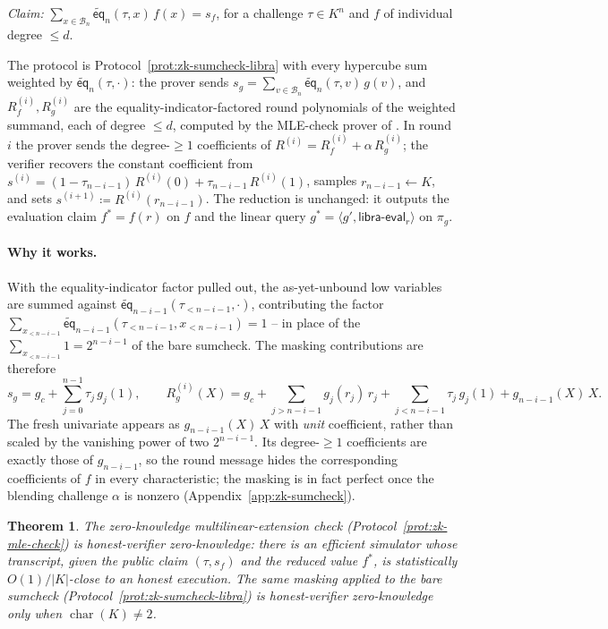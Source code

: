 \documentclass{article}
\newtheorem{theorem}{Theorem}[section]
\theoremstyle{definition}
\newcommand*{\mle}{\widetilde}
\newcommand{\eq}{\mathsf{eq}}
\newcommand{\BB}{\mathcal{B}}
\begin{document}
\begin{protocol}
\label{prot:zk-mle-check}
\emph{Claim:} $\sum_{x \in \BB_n} \mle{\eq}_n(\tau, x)\, f(x) = s_f$, for a challenge $\tau \in K^n$ and $f$ of individual degree $\le d$.

The protocol is Protocol~\ref{prot:zk-sumcheck-libra} with every hypercube sum weighted by $\mle{\eq}_n(\tau, \cdot)$: the prover sends $s_g = \sum_{v \in \BB_n} \mle{\eq}_n(\tau, v)\, g(v)$, and $R_f^{(i)}, R_g^{(i)}$ are the equality-indicator-factored round polynomials of the weighted summand, each of degree $\le d$, computed by the MLE-check prover of \cite{Gruen:2024aa}. In round $i$ the prover sends the degree-$\ge 1$ coefficients of $R^{(i)} = R_f^{(i)} + \alpha\, R_g^{(i)}$; the verifier recovers the constant coefficient from $s^{(i)} = (1 - \tau_{n - i - 1})\, R^{(i)}(0) + \tau_{n - i - 1}\, R^{(i)}(1)$, samples $r_{n - i - 1} \gets K$, and sets $s^{(i + 1)} \coloneqq R^{(i)}(r_{n - i - 1})$. The reduction is unchanged: it outputs the evaluation claim $f^* = f(r)$ on $f$ and the linear query $g^* = \langle g', \textsf{libra-eval}_r \rangle$ on $\pi_g$.
\end{protocol}

\paragraph{Why it works.}
With the equality-indicator factor pulled out, the as-yet-unbound low variables are summed against $\mle{\eq}_{n - i - 1}(\tau_{< n - i - 1}, \cdot)$, contributing the factor $\sum_{x_{< n - i - 1}} \mle{\eq}_{n - i - 1}(\tau_{< n - i - 1}, x_{< n - i - 1}) = 1$ -- in place of the $\sum_{x_{< n - i - 1}} 1 = 2^{n - i - 1}$ of the bare sumcheck. The masking contributions are therefore
\[
  s_g = g_c + \sum_{j = 0}^{n - 1} \tau_j\, g_j(1), \qquad R_g^{(i)}(X) = g_c + \sum_{j > n - i - 1} g_j(r_j)\, r_j + \sum_{j < n - i - 1} \tau_j\, g_j(1) + g_{n - i - 1}(X)\, X.
\]
The fresh univariate appears as $g_{n - i - 1}(X)\, X$ with \emph{unit} coefficient, rather than scaled by the vanishing power of two $2^{n - i - 1}$. Its degree-$\ge 1$ coefficients are exactly those of $g_{n - i - 1}$, so the round message hides the corresponding coefficients of $f$ in every characteristic; the masking is in fact perfect once the blending challenge $\alpha$ is nonzero (Appendix~\ref{app:zk-sumcheck}).

\begin{theorem}
\label{thm:zk-mle-check}
The zero-knowledge multilinear-extension check (Protocol~\ref{prot:zk-mle-check}) is honest-verifier zero-knowledge: there is an efficient simulator whose transcript, given the public claim $(\tau, s_f)$ and the reduced value $f^*$, is statistically $O(1)/|K|$-close to an honest execution. The same masking applied to the bare sumcheck (Protocol~\ref{prot:zk-sumcheck-libra}) is honest-verifier zero-knowledge only when $\operatorname{char}(K) \neq 2$.
\end{theorem}
\end{document}
